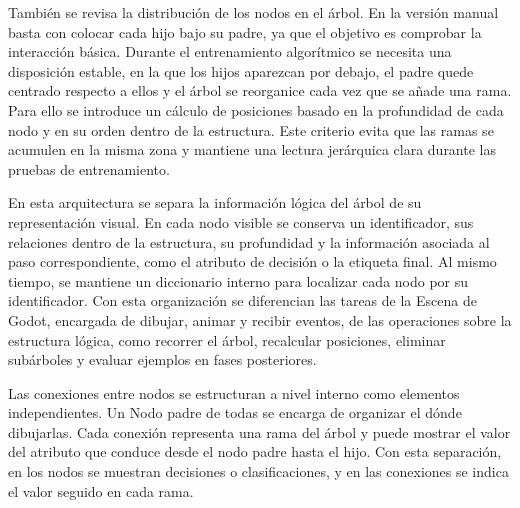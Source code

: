 También se revisa la distribución de los \gls{nodo}s en el árbol.
En la versión manual basta con colocar cada hijo bajo su padre, ya que el objetivo es comprobar la interacción básica.
Durante el entrenamiento algorítmico se necesita una disposición estable, en la que los hijos aparezcan por debajo, el padre quede centrado respecto a ellos y el árbol se reorganice cada vez que se añade una rama.
Para ello se introduce un cálculo de posiciones basado en la profundidad de cada \gls{nodo} y en su orden dentro de la estructura.
Este criterio evita que las ramas se acumulen en la misma zona y mantiene una lectura jerárquica clara durante las pruebas de entrenamiento.

En esta arquitectura se separa la información lógica del árbol de su representación visual.
En cada \gls{nodo} visible se conserva un identificador, sus relaciones dentro de la estructura, su profundidad y la información asociada al paso correspondiente, como el atributo de decisión o la etiqueta final.
Al mismo tiempo, se mantiene un diccionario interno para localizar cada \gls{nodo} por su identificador.
Con esta organización se diferencian las tareas de la \gls{Escena} de Godot, encargada de dibujar, animar y recibir eventos, de las operaciones sobre la estructura lógica, como recorrer el árbol, recalcular posiciones, eliminar subárboles y evaluar ejemplos en fases posteriores.

Las conexiones entre \gls{nodo}s se estructuran a nivel interno como elementos independientes.
Un \gls{Nodo} padre de todas se encarga de organizar el dónde dibujarlas.
Cada conexión representa una rama del árbol y puede mostrar el valor del atributo que conduce desde el \gls{nodo} padre hasta el hijo.
Con esta separación, en los \gls{nodo}s se muestran decisiones o clasificaciones, y en las conexiones se indica el valor seguido en cada rama.

